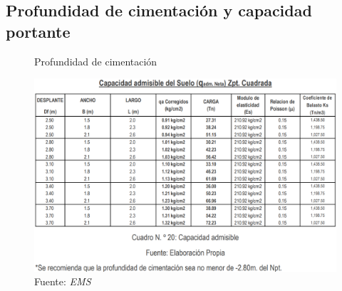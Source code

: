 \newpage
\subsection{Profundidad de cimentación y capacidad portante}

\begin{figure}[h!]
    \centering
    \caption{Profundidad de cimentación}
    \includegraphics[scale=0.6]{IMAGENES/2.PNG}
    \caption*{\small Fuente: \it EMS}
    \label{fig:my_label}
\end{figure}

